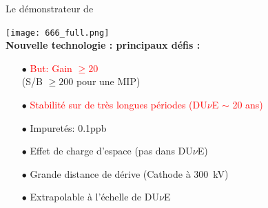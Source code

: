     \begin{frame}{Le démonstrateur de \SSS{}}
    	\begin{scriptsize}
                \centering
    			\texttt{[image: 666\_full.png]}\\
    			\vfill
    			\textbf{Nouvelle technologie : principaux défis :}\\
    			\begin{minipage}{0.32\textwidth}
    				\begin{itemize}
    					\item[$\bullet$] \textcolor{red}{But: Gain $\geq 20$} \\(S/B $\geq 200$ pour une MIP)
    					\item[$\bullet$] \textcolor{red}{Stabilité sur de très longues périodes (DU$\nu$E $\sim$ 20 ans)}
    				\end{itemize}
    			\end{minipage}\hfill
    			\begin{minipage}{0.32\textwidth}
    				\begin{itemize}
    					\item[$\bullet$] Impuretés: 0.1\;ppb
    					\item[$\bullet$] Effet de charge d'espace
    					(pas dans DU$\nu$E)
    				\end{itemize}
	    		\end{minipage}\hfill
	    		\begin{minipage}{0.32\textwidth}
	    			\begin{itemize}
	    				\item[$\bullet$] Grande distance de dérive (Cathode à \SI{300}{\kilo\volt})
	    				\item[$\bullet$] Extrapolable à l'échelle de DU$\nu$E
	    			\end{itemize}
	    		\end{minipage}
    	\end{scriptsize} 
    \end{frame}

